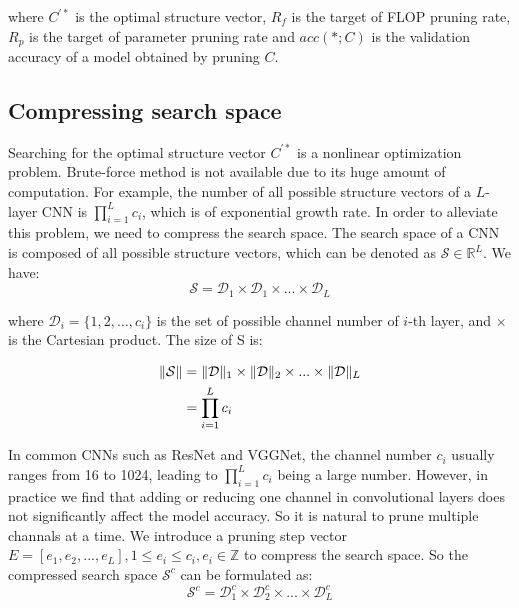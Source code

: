 \documentclass[final]{cvpr}
\begin{document}
\noindent where $C^{'*}$ is the optimal structure vector, $R_{f}$ is the target of FLOP pruning rate, $R_{p}$ is the 
target of parameter pruning rate and $acc(*;C)$ is the validation accuracy of a model obtained by pruning $C$.

\subsection{Compressing search space}

Searching for the optimal structure vector $C^{'*}$ is a nonlinear optimization problem. Brute-force 
method is not available due to its huge amount of computation. For example, the number of all possible structure vectors of a $L$-layer 
CNN is $\prod_{i=1}^{L}c_i$, which is of exponential growth rate. In order to alleviate this problem, we need to compress 
the search space.
The search space of a CNN is composed of all possible structure vectors, which can be denoted as $\mathcal{S} \in \mathbb{R}^L$. We have:
\begin{equation}
    \mathcal{S} = \mathcal{D}_1 \times \mathcal{D}_1 \times ... \times \mathcal{D}_L \label{eq3}
\end{equation}

\noindent where $\mathcal{D}_i=\{1,2,…,c_i\}$ is the set of possible channel number of $i$-th layer, and $\times$ is the Cartesian product. The size of S is:

\begin{align}
    \|\mathcal{S}\| & = \|\mathcal{D}\|_1 \times \|\mathcal{D}\|_2 \times ... \times \|\mathcal{D}\|_L \notag\\
    & = \prod_{i=1}^{L}c_i \label{eq4}
\end{align}

In common CNNs such as ResNet and VGGNet, the channel number $c_i$ usually ranges from 16 to 1024, leading to $\prod_{i=1}^{L}c_i$  
being a large number. However, in practice we find that adding or reducing one channel in convolutional layers does 
not significantly affect the model accuracy. So it is natural to prune multiple channals at a time. We introduce a pruning 
step vector $E=[e_1,e_2,...,e_L],1 \leq e_i\leq c_i, e_i \in \mathbb{Z}$ to compress the search space. 
So the compressed search space $\mathcal{S}^{c}$ can be formulated as: 
\begin{equation}
    \mathcal{S}^{c} = \mathcal{D}^c_1 \times \mathcal{D}^c_2 \times ... \times \mathcal{D}^c_L \label{eq5}
\end{equation}
\end{document}
